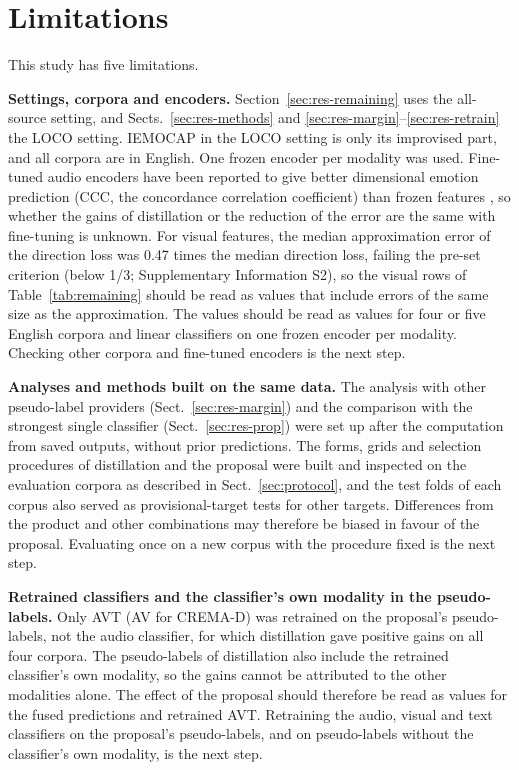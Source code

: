\section{Limitations}\label{sec:limitations}

This study has five limitations.

\textbf{Settings, corpora and encoders.} Section~\ref{sec:res-remaining} uses the all-source setting, and Sects.~\ref{sec:res-methods} and \ref{sec:res-margin}--\ref{sec:res-retrain} the LOCO setting. IEMOCAP in the LOCO setting is only its improvised part, and all corpora are in English. One frozen encoder per modality was used. Fine-tuned audio encoders have been reported to give better dimensional emotion prediction (CCC, the concordance correlation coefficient) than frozen features \cite{wagner2023}, so whether the gains of distillation or the reduction of the error are the same with fine-tuning is unknown. For visual features, the median approximation error of the direction loss was 0.47 times the median direction loss, failing the pre-set criterion (below 1/3; Supplementary Information S2), so the visual rows of Table~\ref{tab:remaining} should be read as values that include errors of the same size as the approximation. The values should be read as values for four or five English corpora and linear classifiers on one frozen encoder per modality. Checking other corpora and fine-tuned encoders is the next step.

\textbf{Analyses and methods built on the same data.} The analysis with other pseudo-label providers (Sect.~\ref{sec:res-margin}) and the comparison with the strongest single classifier (Sect.~\ref{sec:res-prop}) were set up after the computation from saved outputs, without prior predictions. The forms, grids and selection procedures of distillation and the proposal were built and inspected on the evaluation corpora as described in Sect.~\ref{sec:protocol}, and the test folds of each corpus also served as provisional-target tests for other targets. Differences from the product and other combinations may therefore be biased in favour of the proposal. Evaluating once on a new corpus with the procedure fixed is the next step.

\textbf{Retrained classifiers and the classifier's own modality in the pseudo-labels.} Only AVT (AV for CREMA-D) was retrained on the proposal's pseudo-labels, not the audio classifier, for which distillation gave positive gains on all four corpora. The pseudo-labels of distillation also include the retrained classifier's own modality, so the gains cannot be attributed to the other modalities alone. The effect of the proposal should therefore be read as values for the fused predictions and retrained AVT. Retraining the audio, visual and text classifiers on the proposal's pseudo-labels, and on pseudo-labels without the classifier's own modality, is the next step.

